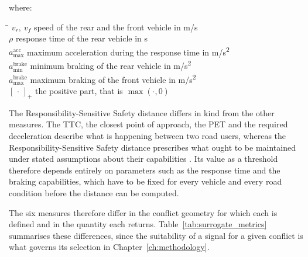 where:\nopagebreak
\begin{tabbing}
    \hspace{2.2cm} \= \kill
    $v_r,\ v_f$ \> speed of the rear and the front vehicle in m/s \\
    $\rho$ \> response time of the rear vehicle in s \\
    $a_\mathrm{max}^\mathrm{acc}$ \> maximum acceleration during the response time in m/s\textsuperscript{2} \\
    $a_\mathrm{min}^\mathrm{brake}$ \> minimum braking of the rear vehicle in m/s\textsuperscript{2} \\
    $a_\mathrm{max}^\mathrm{brake}$ \> maximum braking of the front vehicle in m/s\textsuperscript{2} \\
    $[\,\cdot\,]_{+}$ \> the positive part, that is $\max(\cdot,0)$
\end{tabbing}

The Responsibility-Sensitive Safety distance differs in kind from the other measures.
The \ac{TTC}, the closest point of approach, the \ac{PET} and the required
deceleration describe what is happening between two road users, whereas the
Responsibility-Sensitive Safety distance prescribes what ought to be maintained under
stated assumptions about their capabilities \cite{shalev2017rss}. Its value as a
threshold therefore depends entirely on parameters such as the response time and the
braking capabilities, which have to be fixed for every vehicle and every road
condition before the distance can be computed.

The six measures therefore differ in the conflict geometry for which each is defined and in
the quantity each returns. Table~\ref{tab:surrogate_metrics} summarises these
differences, since the suitability of a signal for a given conflict is what governs its
selection in Chapter~\ref{ch:methodology}.

